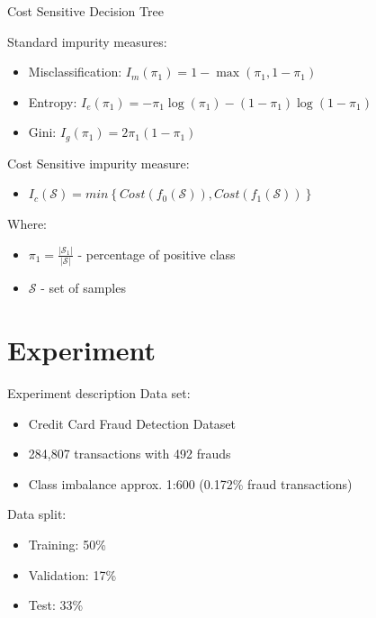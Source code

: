\documentclass[10pt]{beamer}
\begin{document}
\begin{frame}{Cost Sensitive Decision Tree}

    Standard impurity measures:
    \begin{itemize}
        \item Misclassification: $I_m(\pi_1) = 1 - \max(\pi_1, 1 - \pi_1)$
        \item Entropy: $I_e(\pi_1) = -\pi_1 \log(\pi_1) - (1 - \pi_1) \log (1 - \pi_1)$
        \item Gini: $I_g(\pi_1) = 2 \pi_1 (1 - \pi_1)$
    \end{itemize}{}
    
    Cost Sensitive impurity measure:
    \begin{itemize}
        \item $I_c(\mathcal{S}) = min \left\{ Cost(f_0(\mathcal{S})), Cost(f_1(\mathcal{S})) \right\}$
    \end{itemize}{}
    
    Where:
    \begin{itemize}
        \item $\pi_1 = \frac{|\mathcal{S}_{1}|}{|\mathcal{S}|}$ - percentage of positive class
        \item $\mathcal{S}$ - set of samples
    \end{itemize}{}
\end{frame}{}

\section{Experiment}

\begin{frame}{Experiment description}
    Data set:
        \begin{itemize}
            \item Credit Card Fraud Detection Dataset 
            \item 284,807 transactions with 492 frauds
            \item Class imbalance approx. 1:600 (0.172\% fraud transactions)
        \end{itemize}{}
    Data split:
        \begin{itemize}
            \item Training: 50\%
            \item Validation: 17\%
            \item Test: 33\%
        \end{itemize}{}
\end{frame}
\end{document}
